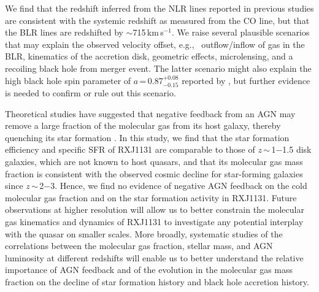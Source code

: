 \documentclass[]{emulateapj}
\newcommand{\kms}{\mbox{km\,s$^{-1}$}\xspace}
\newcommand{\petm}[2]{$^{+#1}_{-#2}$}
\newcommand{\eq}{\,=\,}
\newcommand{\ssim}{\,$\sim$\,}
\newcommand{\eg}{{e.g.,~}}
\begin{document}
We find that the redshift inferred from the NLR lines reported in previous studies are consistent with the  systemic redshift as measured
from the CO line,
but that the BLR lines are redshifted by $\sim$715\,\kms.
We raise several plausible scenarios that may explain the observed velocity offset, \eg
outflow/inflow of gas in the BLR, kinematics of the accretion disk, geometric effects,
microlensing, and a recoiling black hole from merger event.
The latter scenario might also explain the high black hole spin parameter of
$a$\eq0.87\petm{0.08}{0.15} reported by \citet[][]{Reis14a}, but
further evidence is needed to confirm or rule out this scenario.


Theoretical studies have suggested that negative feedback from an AGN may remove a
large fraction of the molecular gas from its host galaxy, thereby quenching its star formation \mbox{\citep[e.g., ][]{DiMatteo05a}}.
In this study, we find that the star formation efficiency and specific SFR of RXJ1131 are comparable to those of
$z$\ssim1$-$1.5 disk galaxies, which are not known to host quasars, and that its
molecular gas mass fraction is consistent with the observed cosmic decline for star-forming
galaxies since $z$\ssim2$-$3.
Hence, we find no evidence of negative AGN feedback on the cold molecular gas fraction
and on the star formation activity in RXJ1131.
Future observations at higher resolution will allow us to better constrain the molecular gas kinematics and dynamics of
RXJ1131 to investigate any potential interplay with the quasar on smaller scales.
More broadly, systematic studies of the correlations between the molecular gas fraction, stellar mass, and AGN luminosity
at different redshifts
will enable us to better understand the relative importance of AGN feedback and of the
evolution in the molecular gas mass fraction on the decline of star formation history and black hole accretion history.
\end{document}
